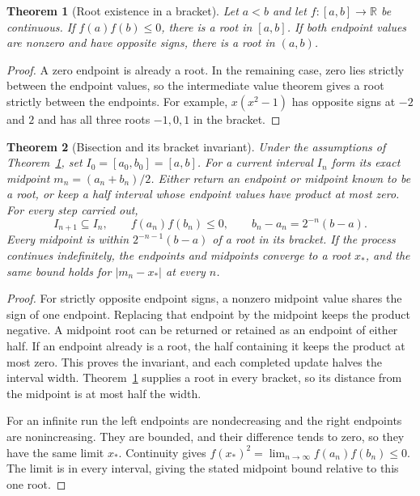 \documentclass[11pt,oneside,openany]{book}
\theoremstyle{plain}
\newtheorem{theorem}{Theorem}[chapter]
\theoremstyle{definition}
\theoremstyle{remark}
\begin{document}
\begin{theorem}[Root existence in a bracket]\label{p206:W62}
Let \(a<b\) and let \(f\colon[a,b]\to\mathbb R\) be continuous. If
\(f(a)f(b)\le 0\), there is a root in \([a,b]\). If both endpoint values
are nonzero and have opposite signs, there is a root in \((a,b)\).
\end{theorem}
\begin{proof}
A zero endpoint is already a root. In the remaining case, zero lies
strictly between the endpoint values, so the intermediate value theorem
\cite[entry \texttt{K03.03.intermediate\_values}]{d03} gives a root
strictly between the endpoints. For example, \(x(x^2-1)\) has opposite
signs at \(-2\) and \(2\) and has all three roots \(-1,0,1\) in the
bracket.
\end{proof}

\begin{theorem}[Bisection and its bracket invariant]\label{p206:W63}
Under the assumptions of Theorem~\ref{p206:W62}, set
\(I_0=[a_0,b_0]=[a,b]\). For a current interval \(I_n\) form its exact
midpoint \(m_n=(a_n+b_n)/2\). Either return an endpoint or midpoint
known to be a root, or keep a half interval whose endpoint values
have product at most zero. For every step carried out,
\[
 I_{n+1}\subseteq I_n,\qquad f(a_n)f(b_n)\le 0,\qquad
 b_n-a_n=2^{-n}(b-a).
\]
Every midpoint is within \(2^{-n-1}(b-a)\) of a root in its bracket.
If the process continues indefinitely, the endpoints and midpoints
converge to a root \(x_*\), and the same bound holds for
\(\lvert m_n-x_*\rvert\) at every \(n\).
\end{theorem}
\begin{proof}
For strictly opposite endpoint signs, a nonzero midpoint value shares
the sign of one endpoint. Replacing that endpoint by the midpoint
keeps the product negative. A midpoint root can be returned or retained
as an endpoint of either half. If an endpoint already is a root, the
half containing it keeps the product at most zero. This proves the
invariant, and each completed update halves the interval width.
Theorem~\ref{p206:W62} supplies a root in every bracket, so its distance
from the midpoint is at most half the width.

For an infinite run the left endpoints are nondecreasing and the
right endpoints are nonincreasing. They are bounded, and their
difference tends to zero, so they have the same limit \(x_*\).
Continuity gives
\(f(x_*)^2=\lim_{n\to\infty}f(a_n)f(b_n)\le0\).
The limit is in every interval, giving the stated midpoint bound
relative to this one root.
\end{proof}
\end{document}
